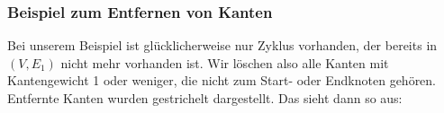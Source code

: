 \subsubsection{Beispiel zum Entfernen von Kanten}

Bei unserem Beispiel ist glücklicherweise nur Zyklus vorhanden, der bereits in $(V,E_1)$ nicht mehr vorhanden ist. Wir löschen also alle Kanten mit Kantengewicht 1 oder weniger, die nicht zum Start- oder Endknoten gehören. Entfernte Kanten wurden gestrichelt dargestellt. Das sieht dann so aus:  

\begin{center}
	\begin{tikzpicture}[
	mycircle/.style={
		circle,
		draw=black,
		fill opacity = 0.3,
		text opacity=1,
		inner sep=0pt,
		minimum size=15pt,
		font=\tiny},
	myarrow/.style={-Stealth},
	node distance=0.6cm and 1.1cm
	]
	

\end{tikzpicture}
\end{center}
